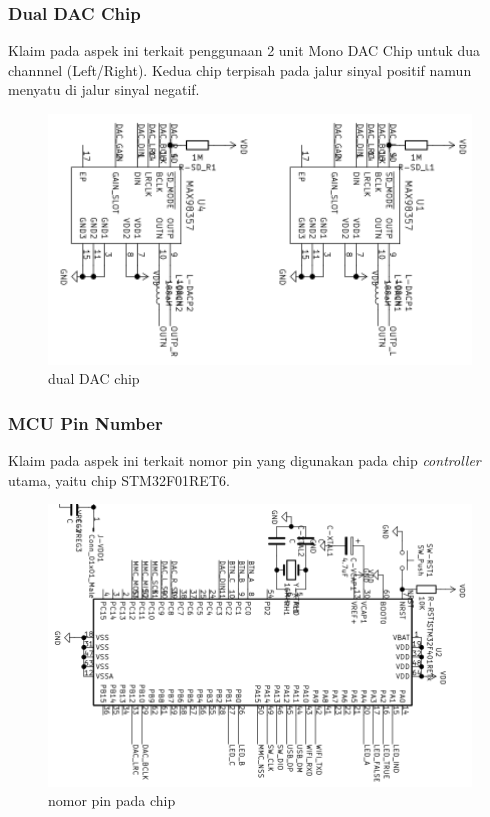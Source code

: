 \documentclass[12pt,]{article}
\begin{document}
	\subsubsection{Dual DAC Chip}
	
	Klaim pada aspek ini terkait penggunaan 2 unit Mono DAC Chip untuk dua channnel (Left/Right).
	Kedua chip terpisah pada jalur sinyal positif namun menyatu di jalur sinyal negatif.
	
	\begin{figure}[!ht]
		\centering
		\includegraphics[width=350pt]{images/dac}
		\caption{dual DAC chip}
	\end{figure}
	
	\newpage
	\subsubsection{MCU Pin Number}
	
	Klaim pada aspek ini terkait nomor pin yang digunakan pada chip \textit{controller} utama,
	yaitu chip STM32F01RET6.
	
	\begin{figure}[!ht]
		\centering
		\includegraphics[width=350pt]{images/chip}
		\caption{nomor pin pada chip }
	\end{figure}
	
\end{document}
